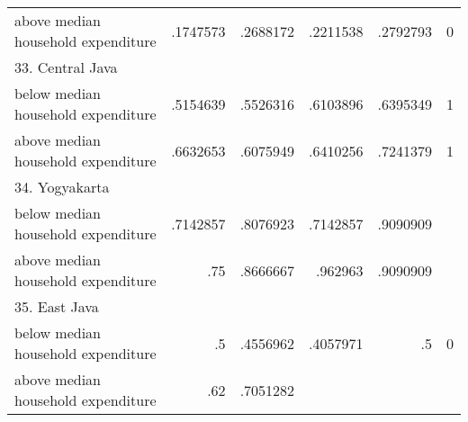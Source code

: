 \begin{table}[!h]
\begin{tabular}{llllll}
\multicolumn{1}{l}{\hspace{1em}above median household expenditure} &
  \multicolumn{1}{|r}{.1747573} &
  \multicolumn{1}{r}{.2688172} &
  \multicolumn{1}{r}{.2211538} &
  \multicolumn{1}{r}{.2792793} &
  \multicolumn{1}{r}{0} \\
\multicolumn{1}{l}{33. Central Java} &
  \multicolumn{1}{|r}{} &
  \multicolumn{1}{r}{} &
  \multicolumn{1}{r}{} &
  \multicolumn{1}{r}{} &
  \multicolumn{1}{r}{} \\
\multicolumn{1}{l}{\hspace{1em}below median household expenditure} &
  \multicolumn{1}{|r}{.5154639} &
  \multicolumn{1}{r}{.5526316} &
  \multicolumn{1}{r}{.6103896} &
  \multicolumn{1}{r}{.6395349} &
  \multicolumn{1}{r}{1} \\
\multicolumn{1}{l}{\hspace{1em}above median household expenditure} &
  \multicolumn{1}{|r}{.6632653} &
  \multicolumn{1}{r}{.6075949} &
  \multicolumn{1}{r}{.6410256} &
  \multicolumn{1}{r}{.7241379} &
  \multicolumn{1}{r}{1} \\
\multicolumn{1}{l}{34. Yogyakarta} &
  \multicolumn{1}{|r}{} &
  \multicolumn{1}{r}{} &
  \multicolumn{1}{r}{} &
  \multicolumn{1}{r}{} &
  \multicolumn{1}{r}{} \\
\multicolumn{1}{l}{\hspace{1em}below median household expenditure} &
  \multicolumn{1}{|r}{.7142857} &
  \multicolumn{1}{r}{.8076923} &
  \multicolumn{1}{r}{.7142857} &
  \multicolumn{1}{r}{.9090909} &
  \multicolumn{1}{r}{} \\
\multicolumn{1}{l}{\hspace{1em}above median household expenditure} &
  \multicolumn{1}{|r}{.75} &
  \multicolumn{1}{r}{.8666667} &
  \multicolumn{1}{r}{.962963} &
  \multicolumn{1}{r}{.9090909} &
  \multicolumn{1}{r}{} \\
\multicolumn{1}{l}{35. East Java} &
  \multicolumn{1}{|r}{} &
  \multicolumn{1}{r}{} &
  \multicolumn{1}{r}{} &
  \multicolumn{1}{r}{} &
  \multicolumn{1}{r}{} \\
\multicolumn{1}{l}{\hspace{1em}below median household expenditure} &
  \multicolumn{1}{|r}{.5} &
  \multicolumn{1}{r}{.4556962} &
  \multicolumn{1}{r}{.4057971} &
  \multicolumn{1}{r}{.5} &
  \multicolumn{1}{r}{0} \\
\multicolumn{1}{l}{\hspace{1em}above median household expenditure} &
  \multicolumn{1}{|r}{.62} &
  \multicolumn{1}{r}{.7051282} &

\end{tabular}
\end{table}
